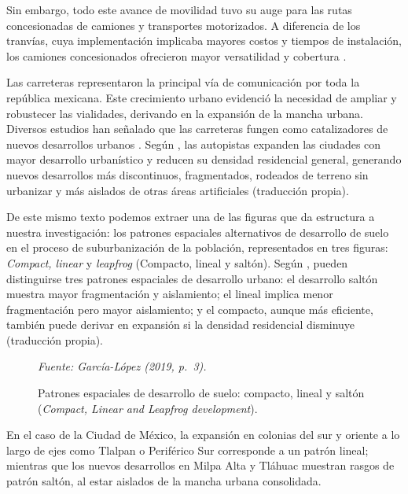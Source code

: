 Sin embargo, todo este avance de movilidad tuvo su auge para las rutas
concesionadas de camiones y transportes motorizados. A diferencia de los tranvías,
cuya implementación implicaba mayores costos y tiempos de instalación, los
camiones concesionados ofrecieron mayor versatilidad y cobertura \parencite{franco2022}.

Las carreteras representaron la principal vía de comunicación por toda la república
mexicana. Este crecimiento urbano evidenció la necesidad de ampliar y robustecer
las vialidades, derivando en la expansión de la mancha urbana. Diversos estudios
han señalado que las carreteras fungen como catalizadores de nuevos desarrollos
urbanos \parencite{garcia2019allroads}. Según \textcite{garcia2019allroads}, las autopistas
expanden las ciudades con mayor desarrollo urbanístico y reducen su densidad
residencial general, generando nuevos desarrollos más discontinuos, fragmentados,
rodeados de terreno sin urbanizar y más aislados de otras áreas artificiales
(traducción propia).

De este mismo texto podemos extraer una de las figuras que da estructura a nuestra
investigación: los patrones espaciales alternativos de desarrollo de suelo en el
proceso de suburbanización de la población, representados en tres figuras:
\textit{Compact, linear} y \textit{leapfrog} (Compacto, lineal y saltón). Según
\textcite{jia2010}, pueden distinguirse tres patrones espaciales de desarrollo urbano:
el desarrollo saltón muestra mayor fragmentación y aislamiento; el lineal implica
menor fragmentación pero mayor aislamiento; y el compacto, aunque más eficiente,
también puede derivar en expansión si la densidad residencial disminuye (traducción
propia).

\begin{figure}[htbp]
    \centering
    \caption[Patrones de desarrollo urbano]{Patrones espaciales de desarrollo de suelo:
    compacto, lineal y saltón (\textit{Compact, Linear and Leapfrog development}).}
    \label{fig:sprawl}
    \small\textit{Fuente: García-López (2019, p.~3).}
\end{figure}

En el caso de la Ciudad de México, la expansión en colonias del sur y oriente a lo
largo de ejes como Tlalpan o Periférico Sur corresponde a un patrón lineal; mientras
que los nuevos desarrollos en Milpa Alta y Tláhuac muestran rasgos de patrón
saltón, al estar aislados de la mancha urbana consolidada.

